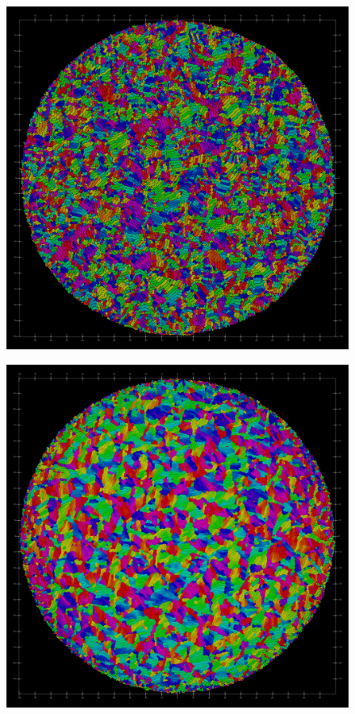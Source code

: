\documentclass[conference]{IEEEtran}
\begin{document}
\begin{figure}[h]
    \centering
    \includegraphics[width=\linewidth]{figures/orientation_comparisons/hard_e-4_orient.jpeg}
    \caption{ }
\end{figure}
\begin{figure}[h]
    \centering
    \includegraphics[width=\linewidth]{figures/orientation_comparisons/soft_e-2_orient.jpeg}
    \caption{ }
\end{figure}
\end{document}
